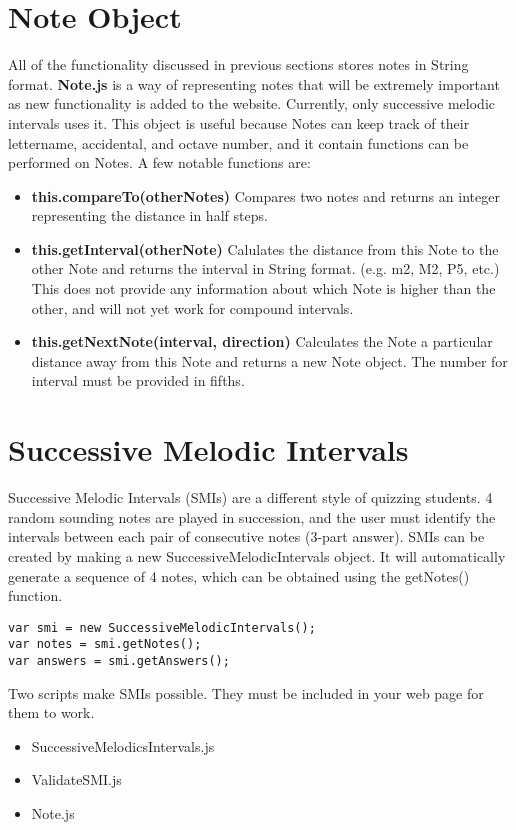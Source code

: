 \documentclass{article}
\begin{document}
\section{Note Object}
All of the functionality discussed in previous sections stores notes in String format. \textbf{Note.js} is a way of representing notes that will be extremely important as new functionality is added to the website. Currently, only successive melodic intervals uses it. This object is useful because Notes can keep track of their lettername, accidental, and octave number, and it contain functions can be performed on Notes. A few notable functions are:

\begin{itemize}
    \item \textbf{this.compareTo(otherNotes)} Compares two notes and returns an integer representing the distance in half steps.
    \item \textbf{this.getInterval(otherNote)} Calulates the distance from this Note to the other Note and returns the interval in String format. (e.g. m2, M2, P5, etc.) This does not provide any information about which Note is higher than the other, and will not yet work for compound intervals.
    \item \textbf{this.getNextNote(interval, direction)} Calculates the Note a particular distance away from this Note and returns a new Note object. The number for interval must be provided in fifths.
\end{itemize}


\section{Successive Melodic Intervals}
Successive Melodic Intervals (SMIs) are a different style of quizzing students. 4 random sounding notes are played in succession, and the user must identify the intervals between each pair of consecutive notes (3-part answer). SMIs can be created by making a new SuccessiveMelodicIntervals object. It will automatically generate a sequence of 4 notes, which can be obtained using the getNotes() function.
\begin{lstlisting}
var smi = new SuccessiveMelodicIntervals();
var notes = smi.getNotes();
var answers = smi.getAnswers();
\end{lstlisting}
Two scripts make SMIs possible. They must be included in your web page for them to work.
\begin{itemize}
    \item SuccessiveMelodicsIntervals.js
    \item ValidateSMI.js
    \item Note.js
\end{itemize}
\end{document}
